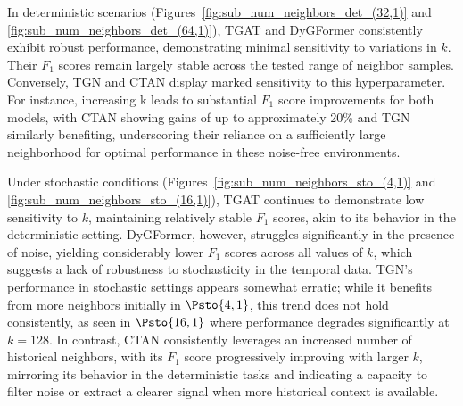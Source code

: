 In deterministic scenarios (Figures~\ref{fig:sub_num_neighbors_det_(32,1)} and \ref{fig:sub_num_neighbors_det_(64,1)}), TGAT and DyGFormer consistently exhibit robust performance, demonstrating minimal sensitivity to variations in $k$. Their $F_1$ scores remain largely stable across the tested range of neighbor samples. Conversely, TGN and CTAN display marked sensitivity to this hyperparameter. For instance, increasing k leads to substantial $F_1$ score improvements for both models, with CTAN showing gains of up to approximately 20\% and TGN similarly benefiting, underscoring their reliance on a sufficiently large neighborhood for optimal performance in these noise-free environments.


Under stochastic conditions (Figures~\ref{fig:sub_num_neighbors_sto_(4,1)} and \ref{fig:sub_num_neighbors_sto_(16,1)}), TGAT continues to demonstrate low sensitivity to $k$, maintaining relatively stable $F_1$ scores, akin to its behavior in the deterministic setting. DyGFormer, however, struggles significantly in the presence of noise, yielding considerably lower $F_1$ scores across all values of $k$, which suggests a lack of robustness to stochasticity in the temporal data. TGN's performance in stochastic settings appears somewhat erratic; while it benefits from more neighbors initially in $\Psto{4, 1}$, this trend does not hold consistently, as seen in $\Psto{16, 1}$ where performance degrades significantly at $k = 128$. In contrast, CTAN consistently leverages an increased number of historical neighbors, with its $F_1$ score progressively improving with larger $k$, mirroring its behavior in the deterministic tasks and indicating a capacity to filter noise or extract a clearer signal when more historical context is available.


